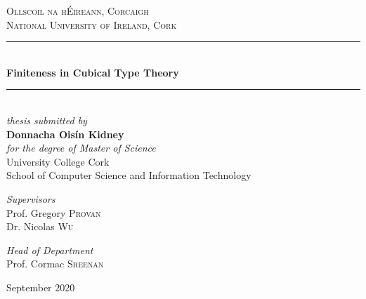 \begin{titlingpage}
\newcommand{\HRule}{\rule{\linewidth}{0.5mm}} 
\centering
\textsc{\Large Ollscoil na hÉireann, Corcaigh} \\
\textsc{\Large National University of Ireland, Cork}
\vfill
\HRule\\[0.4cm]
{\Huge\bfseries Finiteness in Cubical Type Theory}\\[0.2cm]
\HRule \\[1.5cm]
\textit{thesis submitted by} \\[0.3cm]
{\LARGE\bfseries Donnacha Oisín Kidney} \\[0.3cm]
\textit{for the degree of Master of Science}\\
\vfill
University College Cork \\
School of Computer Science and Information Technology
\vfill
\begin{minipage}{0.4\textwidth}
  \begin{flushleft}
    \large
    \textit{Supervisors}\\
    Prof. Gregory \textsc{Provan}\\
    Dr. Nicolas \textsc{Wu}
  \end{flushleft}
\end{minipage}
\begin{minipage}{0.4\textwidth}
  \begin{flushright}
    \large
    \textit{Head of Department}\\
    Prof. Cormac \textsc{Sreenan}\\
    \phantom{word}
  \end{flushright}
\end{minipage}

	
\vfill
September 2020\par
\end{titlingpage}

